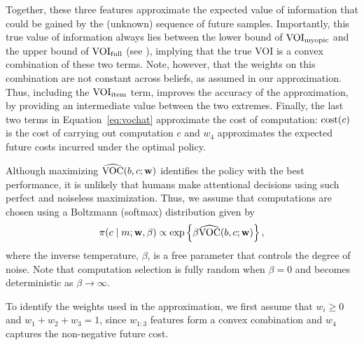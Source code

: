 Together, these three features approximate the expected value of information that could be gained by the (unknown) sequence of future samples. Importantly, this true value of information always lies between the lower bound of $\text{VOI}_\text{myopic}$ and the upper bound of $\text{VOI}_\text{full}$ (see ), implying that the true VOI is a convex combination of these two terms. Note, however, that the weights on this combination are not constant across beliefs, as assumed in our approximation. Thus, including the $\text{VOI}_\text{item}$ term, improves the accuracy of the approximation, by providing an intermediate value between the two extremes. Finally, the last two terms in Equation~\ref{eq:vochat} approximate the cost of computation: $\text{cost}(c)$ is the cost of carrying out computation $c$ and $w_{4}$ approximates the expected future costs incurred under the optimal policy.

Although maximizing $\widehat{\text{VOC}}(b, c; \mathbf{w})$ identifies the policy with the best performance, it is unlikely that humans make attentional decisions using such perfect and noiseless maximization. Thus, 
we assume that computations are chosen using a Boltzmann (softmax) distribution   \citep{mcfadden2001economic} given  by
\[
\pi(c \mid m; \mathbf{w}, \beta) \propto \exp \left\{ \beta\widehat{\text{VOC}}(b, c; \mathbf{w}) \right\},
\]
where the inverse temperature, $\beta$, is a free parameter that controls the degree of noise. Note that computation selection is fully random when $\beta=0$ and becomes deterministic as $\beta\rightarrow\infty$.



To identify the weights used in the approximation, we first assume that $w_{i}\ge0$ and $w_{1}+w_{2}+w_{3}=1$, since $w_{1:3}$ features form a convex combination and $w_4$ captures the non-negative future cost.